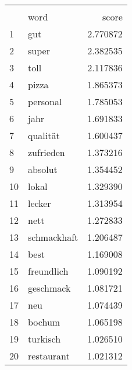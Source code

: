 \begin{tabular}{llr}
\\[-1.8ex]\hline
\hline \\[-1.8ex]
{} &          word &     score \\
\midrule
1  &           gut &  2.770872 \\
2  &         super &  2.382535 \\
3  &          toll &  2.117836 \\
4  &         pizza &  1.865373 \\
5  &      personal &  1.785053 \\
6  &          jahr &  1.691833 \\
7  &      qualität &  1.600437 \\
8  &     zufrieden &  1.373216 \\
9  &       absolut &  1.354452 \\
10 &         lokal &  1.329390 \\
11 &        lecker &  1.313954 \\
12 &          nett &  1.272833 \\
13 &   schmackhaft &  1.206487 \\
14 &          best &  1.169008 \\
15 &    freundlich &  1.090192 \\
16 &     geschmack &  1.081721 \\
17 &           neu &  1.074439 \\
18 &        bochum &  1.065198 \\
19 &      turkisch &  1.026510 \\
20 &    restaurant &  1.021312 \\
\bottomrule
\end{tabular}
